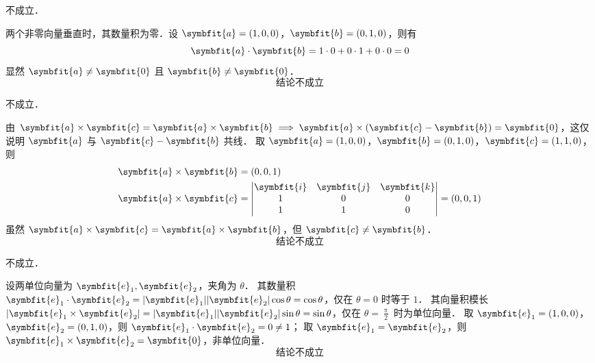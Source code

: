 \begin{solution}
     不成立．

    两个非零向量垂直时，其数量积为零．设 $\symbfit{a} = (1, 0, 0)$，$\symbfit{b} = (0, 1, 0)$，则有
    \begin{equation}
        \symbfit{a} \cdot \symbfit{b} = 1 \cdot 0 + 0 \cdot 1 + 0 \cdot 0 = 0
    \end{equation}
    显然 $\symbfit{a} \neq \symbfit{0}$ 且 $\symbfit{b} \neq \symbfit{0}$．
    \begin{equation}
        \boxed{\text{结论不成立}}
    \end{equation}

     不成立．

    由 $\symbfit{a} \times \symbfit{c} = \symbfit{a} \times \symbfit{b} \implies \symbfit{a} \times (\symbfit{c} - \symbfit{b}) = \symbfit{0}$，这仅说明 $\symbfit{a}$ 与 $\symbfit{c} - \symbfit{b}$ 共线．
    取 $\symbfit{a} = (1, 0, 0)$，$\symbfit{b} = (0, 1, 0)$，$\symbfit{c} = (1, 1, 0)$，则
    \begin{equation}
        \begin{aligned}
            \symbfit{a} \times \symbfit{b} & = (0, 0, 1)                                                                                                   \\
            \symbfit{a} \times \symbfit{c} & = \begin{vmatrix} \symbfit{i} & \symbfit{j} & \symbfit{k} \\ 1 & 0 & 0 \\ 1 & 1 & 0 \end{vmatrix} = (0, 0, 1)
        \end{aligned}
    \end{equation}
    虽然 $\symbfit{a} \times \symbfit{c} = \symbfit{a} \times \symbfit{b}$，但 $\symbfit{c} \neq \symbfit{b}$．
    \begin{equation}
        \boxed{\text{结论不成立}}
    \end{equation}

     不成立．

    设两单位向量为 $\symbfit{e}_1, \symbfit{e}_2$，夹角为 $\theta$．
    其数量积 $\symbfit{e}_1 \cdot \symbfit{e}_2 = |\symbfit{e}_1||\symbfit{e}_2|\cos\theta = \cos\theta$，仅在 $\theta = 0$ 时等于 $1$．
    其向量积模长 $|\symbfit{e}_1 \times \symbfit{e}_2| = |\symbfit{e}_1||\symbfit{e}_2|\sin\theta = \sin\theta$，仅在 $\theta = \frac{\uppi}{2}$ 时为单位向量．
    取 $\symbfit{e}_1 = (1, 0, 0)$，$\symbfit{e}_2 = (0, 1, 0)$，则 $\symbfit{e}_1 \cdot \symbfit{e}_2 = 0 \neq 1$；
    取 $\symbfit{e}_1 = \symbfit{e}_2$，则 $\symbfit{e}_1 \times \symbfit{e}_2 = \symbfit{0}$，非单位向量．
    \begin{equation}
        \boxed{\text{结论不成立}}
    \end{equation}


\end{solution}
